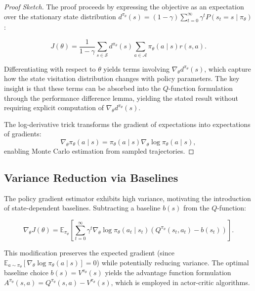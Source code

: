 \begin{proof}[Proof Sketch]
The proof proceeds by expressing the objective as an expectation over the stationary state distribution $d^{\pi_\theta}(s) = (1-\gamma) \sum_{t=0}^{\infty} \gamma^t P(s_t = s \mid \pi_\theta)$:

\begin{equation}
J(\theta) = \frac{1}{1-\gamma} \sum_{s \in \mathcal{S}} d^{\pi_\theta}(s) \sum_{a \in \mathcal{A}} \pi_\theta(a \mid s) r(s, a).
\end{equation}

Differentiating with respect to $\theta$ yields terms involving $\nabla_\theta d^{\pi_\theta}(s)$, which capture how the state visitation distribution changes with policy parameters. The key insight is that these terms can be absorbed into the $Q$-function formulation through the performance difference lemma, yielding the stated result without requiring explicit computation of $\nabla_\theta d^{\pi_\theta}(s)$.

The log-derivative trick transforms the gradient of expectations into expectations of gradients:
\begin{equation}
\nabla_\theta \pi_\theta(a \mid s) = \pi_\theta(a \mid s) \nabla_\theta \log \pi_\theta(a \mid s),
\end{equation}
enabling Monte Carlo estimation from sampled trajectories.
\end{proof}

\subsection{Variance Reduction via Baselines}

The policy gradient estimator exhibits high variance, motivating the introduction of state-dependent baselines. Subtracting a baseline $b(s)$ from the $Q$-function:

\begin{equation}
\nabla_\theta J(\theta) = \mathbb{E}_{\pi_\theta}\left[\sum_{t=0}^{\infty} \gamma^t \nabla_\theta \log \pi_\theta(a_t \mid s_t) \left(Q^{\pi_\theta}(s_t, a_t) - b(s_t)\right)\right].
\end{equation}

This modification preserves the expected gradient (since $\mathbb{E}_{a \sim \pi_\theta}[\nabla_\theta \log \pi_\theta(a \mid s)] = 0$) while potentially reducing variance. The optimal baseline choice $b(s) = V^{\pi_\theta}(s)$ yields the advantage function formulation $A^{\pi_\theta}(s, a) = Q^{\pi_\theta}(s, a) - V^{\pi_\theta}(s)$, which is employed in actor-critic algorithms.

